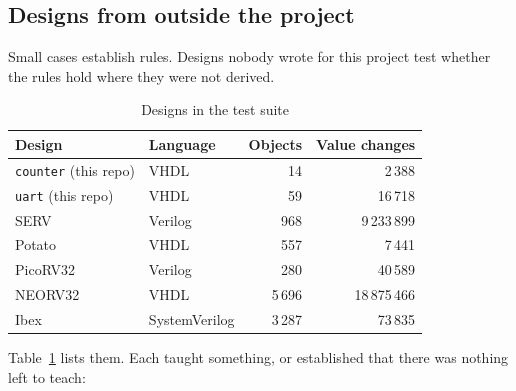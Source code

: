 \subsection{Designs from outside the project}

Small cases establish rules. Designs nobody wrote for this project
test whether the rules hold where they were not derived.

\begin{table}[t]
\caption{Designs in the test suite}
\label{tab:designs}
\centering
\begin{tabular}{llrr}
\toprule
Design & Language & Objects & Value changes \\
\midrule
\texttt{counter} (this repo) & VHDL & 14 & 2\,388 \\
\texttt{uart} (this repo) & VHDL & 59 & 16\,718 \\
SERV~\cite{serv} & Verilog & 968 & 9\,233\,899 \\
Potato~\cite{potato} & VHDL & 557 & 7\,441 \\
PicoRV32~\cite{picorv32} & Verilog & 280 & 40\,589 \\
NEORV32~\cite{neorv32} & VHDL & 5\,696 & 18\,875\,466 \\
Ibex~\cite{ibex} & SystemVerilog & 3\,287 & 73\,835 \\
\bottomrule
\end{tabular}
\end{table}

Table~\ref{tab:designs} lists them. Each taught something, or
established that there was nothing left to teach:

